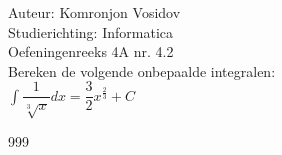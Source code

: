 \documentclass[a4paper]{article}
\newcommand{\dint}{\displaystyle\int}
\begin{document}
	
	\noindent \large Auteur: Komronjon Vosidov \\
	\noindent \large Studierichting: Informatica\\
	\noindent \large Oefeningenreeks 4A nr. 4.2\\
	
	
	\medskip
	\normalsize
	Bereken de volgende onbepaalde integralen:\\
	
$ \dint \dfrac{1}{\sqrt[3]{x}} dx = \dfrac{3}{2} x^{\tfrac{2}{3}} + C $
	
	
	
	
	
	
	
	\begin{thebibliography}{999}
	\end{thebibliography}		
\end{document}

